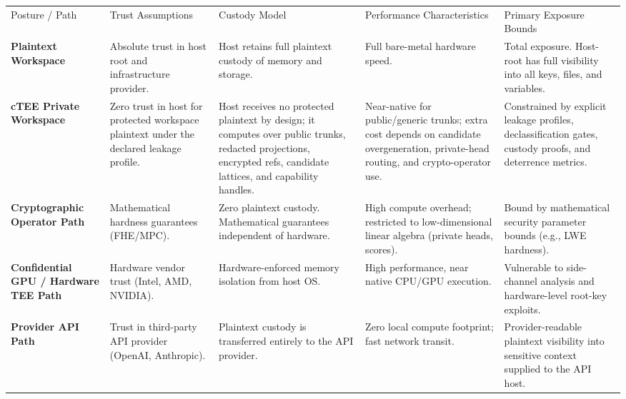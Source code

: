 \documentclass[
  11pt,
]{article}
\begin{document}
\begin{longtable}[]{@{}
  >{\raggedright\arraybackslash}p{}
  >{\raggedright\arraybackslash}p{}
  >{\raggedright\arraybackslash}p{}
  >{\raggedright\arraybackslash}p{}
  >{\raggedright\arraybackslash}p{}@{}}
\toprule\noalign{}
& & & & \\
\midrule\noalign{}
\endhead
\bottomrule\noalign{}
\endlastfoot
Posture / Path & Trust Assumptions & Custody Model & Performance
Characteristics & Primary Exposure Bounds \\
\textbf{Plaintext Workspace} & Absolute trust in host root and
infrastructure provider. & Host retains full plaintext custody of memory
and storage. & Full bare-metal hardware speed. & Total exposure.
Host-root has full visibility into all keys, files, and variables. \\
\textbf{cTEE Private Workspace} & Zero trust in host for protected
workspace plaintext under the declared leakage profile. & Host receives
no protected plaintext by design; it computes over public trunks,
redacted projections, encrypted refs, candidate lattices, and capability
handles. & Near-native for public/generic trunks; extra cost depends on candidate overgeneration,
private-head routing, and crypto-operator use. & Constrained by explicit
leakage profiles, declassification gates, custody proofs, and deterrence
metrics. \\
\textbf{Cryptographic Operator Path} & Mathematical hardness guarantees
(FHE/MPC). & Zero plaintext custody. Mathematical guarantees independent
of hardware. & High compute overhead; restricted to low-dimensional
linear algebra (private heads, scores). & Bound by mathematical security
parameter bounds (e.g., LWE hardness). \\
\textbf{Confidential GPU / Hardware TEE Path} & Hardware vendor trust
(Intel, AMD, NVIDIA). & Hardware-enforced memory isolation from host OS.
& High performance, near native CPU/GPU execution. & Vulnerable to
side-channel analysis and hardware-level root-key exploits. \\
\textbf{Provider API Path} & Trust in third-party API provider (OpenAI,
Anthropic). & Plaintext custody is transferred entirely to the API
provider. & Zero local compute footprint; fast network transit. &
Provider-readable plaintext visibility into sensitive context supplied
to the API host. \\
\end{longtable}
\end{document}
